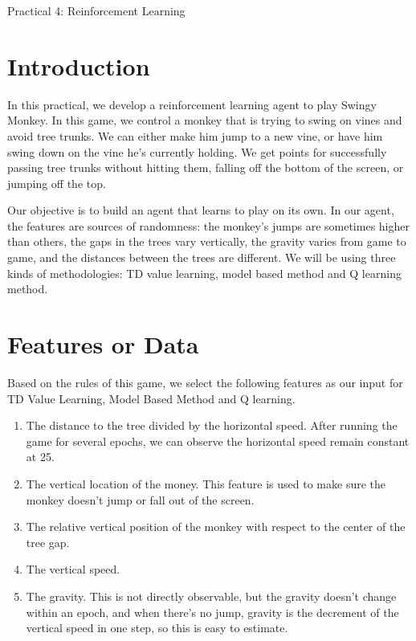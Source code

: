 \documentclass[submit]{harvardml}
\begin{document}
\begin{center}
{\Large Practical 4: Reinforcement Learning}\\
\end{center}

\section{Introduction}
In this practical, we develop a reinforcement learning agent to play Swingy Monkey. In this game, we control a monkey that is trying to swing on vines and avoid tree trunks. We can either make him jump to a new vine, or have him swing down on the vine he’s currently holding. We get points for successfully passing tree trunks without hitting them, falling off the bottom of the screen, or jumping off the top. 

Our objective is to build an agent that learns to play on its own. In our agent, the features are sources of randomness: the monkey’s jumps are sometimes higher than others, the gaps in the trees vary vertically, the gravity varies from game to game, and the distances between the trees are different. We will be using three kinds of methodologies: TD value learning, model based method and Q learning method.

\section{Features or Data}
Based on the rules of this game, we select the following features as our input for TD Value Learning, Model Based Method and Q learning.
\begin{enumerate}
\item The distance to the tree divided by the horizontal speed. After running the game for several epochs, we can observe the horizontal speed remain constant at 25.
\item The vertical location of the money. This feature is used to make sure the monkey doesn't jump or fall out of the screen.
\item The relative vertical position of the monkey with respect to the center of the tree gap.
\item The vertical speed.
\item The gravity. This is not directly observable, but the gravity doesn't change within an epoch, and when there's no jump, gravity is the decrement of the vertical speed in one step, so this is easy to estimate.
\end{enumerate}
\end{document}
